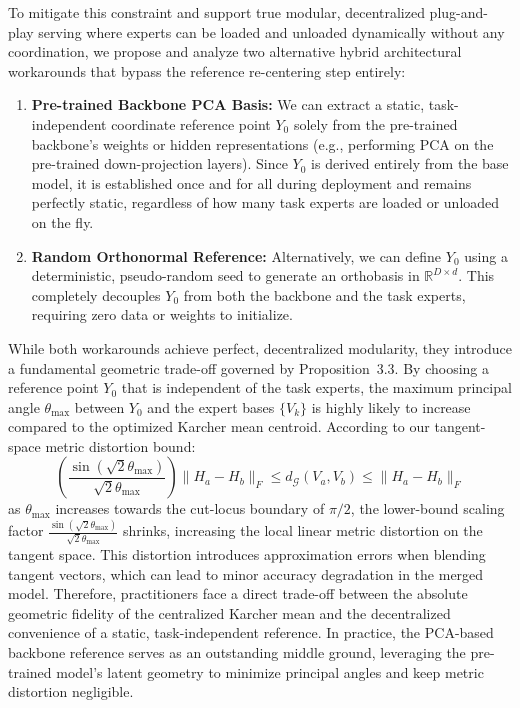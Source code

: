 To mitigate this constraint and support true modular, decentralized plug-and-play serving where experts can be loaded and unloaded dynamically without any coordination, we propose and analyze two alternative hybrid architectural workarounds that bypass the reference re-centering step entirely:
\begin{enumerate}
    \item \textbf{Pre-trained Backbone PCA Basis:} We can extract a static, task-independent coordinate reference point $Y_0$ solely from the pre-trained backbone's weights or hidden representations (e.g., performing PCA on the pre-trained down-projection layers). Since $Y_0$ is derived entirely from the base model, it is established once and for all during deployment and remains perfectly static, regardless of how many task experts are loaded or unloaded on the fly.
    \item \textbf{Random Orthonormal Reference:} Alternatively, we can define $Y_0$ using a deterministic, pseudo-random seed to generate an orthobasis in $\mathbb{R}^{D \times d}$. This completely decouples $Y_0$ from both the backbone and the task experts, requiring zero data or weights to initialize.
\end{enumerate}
While both workarounds achieve perfect, decentralized modularity, they introduce a fundamental geometric trade-off governed by Proposition~3.3. By choosing a reference point $Y_0$ that is independent of the task experts, the maximum principal angle $\theta_{\max}$ between $Y_0$ and the expert bases $\{V_k\}$ is highly likely to increase compared to the optimized Karcher mean centroid. According to our tangent-space metric distortion bound:
\begin{equation}
    \left( \frac{\sin(\sqrt{2}\theta_{\max})}{\sqrt{2}\theta_{\max}} \right) \|H_a - H_b\|_F \le d_{\mathcal{G}}(V_a, V_b) \le \|H_a - H_b\|_F
\end{equation}
as $\theta_{\max}$ increases towards the cut-locus boundary of $\pi/2$, the lower-bound scaling factor $\frac{\sin(\sqrt{2}\theta_{\max})}{\sqrt{2}\theta_{\max}}$ shrinks, increasing the local linear metric distortion on the tangent space. This distortion introduces approximation errors when blending tangent vectors, which can lead to minor accuracy degradation in the merged model. Therefore, practitioners face a direct trade-off between the absolute geometric fidelity of the centralized Karcher mean and the decentralized convenience of a static, task-independent reference. In practice, the PCA-based backbone reference serves as an outstanding middle ground, leveraging the pre-trained model's latent geometry to minimize principal angles and keep metric distortion negligible.

